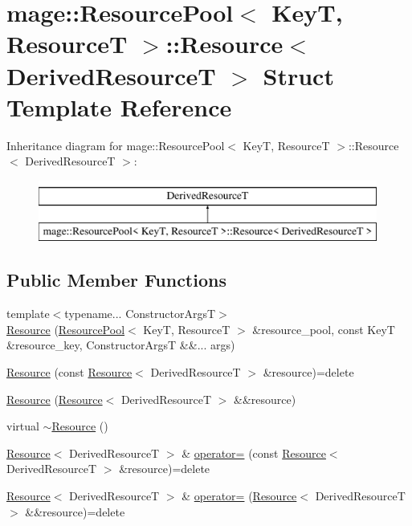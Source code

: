 \hypertarget{structmage_1_1_resource_pool_1_1_resource}{}\section{mage\+:\+:Resource\+Pool$<$ KeyT, ResourceT $>$\+:\+:Resource$<$ Derived\+ResourceT $>$ Struct Template Reference}
\label{structmage_1_1_resource_pool_1_1_resource}
Inheritance diagram for mage\+:\+:Resource\+Pool$<$ KeyT, ResourceT $>$\+:\+:Resource$<$ Derived\+ResourceT $>$\+:\begin{figure}[H]
\begin{center}
\leavevmode
\includegraphics[height=2.000000cm]{structmage_1_1_resource_pool_1_1_resource}
\end{center}
\end{figure}
\subsection*{Public Member Functions}
\begin{DoxyCompactItemize}
\item 
{\footnotesize template$<$typename... Constructor\+ArgsT$>$ }\\\hyperlink{structmage_1_1_resource_pool_1_1_resource_aac2dcc5cb5b92a9126b270e62a7585cb}{Resource} (\hyperlink{classmage_1_1_resource_pool}{Resource\+Pool}$<$ KeyT, ResourceT $>$ \&resource\+\_\+pool, const KeyT \&resource\+\_\+key, Constructor\+ArgsT \&\&... args)
\item 
\hyperlink{structmage_1_1_resource_pool_1_1_resource_a6511948cfd13cff1c84b19be1f1fbddf}{Resource} (const \hyperlink{structmage_1_1_resource_pool_1_1_resource}{Resource}$<$ Derived\+ResourceT $>$ \&resource)=delete
\item 
\hyperlink{structmage_1_1_resource_pool_1_1_resource_a77ee754c3f9ce59cfd378b72b8b1bd52}{Resource} (\hyperlink{structmage_1_1_resource_pool_1_1_resource}{Resource}$<$ Derived\+ResourceT $>$ \&\&resource)
\item 
virtual \hyperlink{structmage_1_1_resource_pool_1_1_resource_a1d8bd565ab8769cedd94c1a42c6ebf46}{$\sim$\+Resource} ()
\item 
\hyperlink{structmage_1_1_resource_pool_1_1_resource}{Resource}$<$ Derived\+ResourceT $>$ \& \hyperlink{structmage_1_1_resource_pool_1_1_resource_a991c260c4ac0acf1761978abc704ac0d}{operator=} (const \hyperlink{structmage_1_1_resource_pool_1_1_resource}{Resource}$<$ Derived\+ResourceT $>$ \&resource)=delete
\item 
\hyperlink{structmage_1_1_resource_pool_1_1_resource}{Resource}$<$ Derived\+ResourceT $>$ \& \hyperlink{structmage_1_1_resource_pool_1_1_resource_a7c280a7e0fd29d7a1fc2f5f0cf51737b}{operator=} (\hyperlink{structmage_1_1_resource_pool_1_1_resource}{Resource}$<$ Derived\+ResourceT $>$ \&\&resource)=delete
\end{DoxyCompactItemize}
